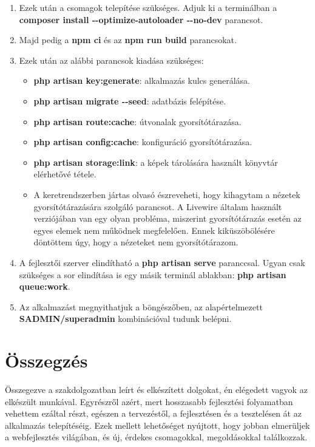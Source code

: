 \documentclass[
]{thesis-ekf}
\theoremstyle{definition}
\theoremstyle{remark}
\begin{document}
\begin{enumerate}
	\item Ezek után a csomagok telepítése szükséges. Adjuk ki a terminálban a \textbf{composer install -\/-optimize-autoloader -\/-no-dev} parancsot.
	\item Majd pedig a \textbf{npm ci} és az \textbf{npm run build} parancsokat.
	\item Ezek után az alábbi parancsok kiadása szükséges:
	\begin{itemize}
		\item \textbf{php artisan key:generate}: alkalmazás kulcs generálása.
		\item \textbf{php artisan migrate -\/-seed}: adatbázis felépítése.
		\item \textbf{php artisan route:cache}: útvonalak gyorsítótárazása.
		\item \textbf{php artisan config:cache}: konfiguráció gyorsítótárazása.
		\item \textbf{php artisan storage:link}: a képek tárolására használt könyvtár elérhetővé tétele.
		\item A keretrendszerben jártas olvasó észreveheti, hogy kihagytam a nézetek gyorsítótárazására szolgáló parancsot. A Livewire általam használt verziójában van egy olyan probléma, miszerint gyorsítótárazás esetén az egyes elemek nem működnek megfelelően. Ennek kiküszöbölésére döntöttem úgy, hogy a nézeteket nem gyorsítótárazom.
	\end{itemize}
	\item A fejlesztői szerver elindítható a \textbf{php artisan serve} paranccsal. Ugyan csak szükséges a sor elindítása is egy másik terminál ablakban: \textbf{php artisan queue:work}.
	\item Az alkalmazást megnyithatjuk a böngészőben, az alapértelmezett \textbf{SADMIN/superadmin} kombinációval tudunk belépni.
\end{enumerate}

\chapter*{Összegzés}

Összegezve a szakdolgozatban leírt és elkészített dolgokat, én elégedett vagyok az elkészült munkával. Egyrészről azért, mert hosszasabb fejlesztési folyamatban vehettem ezáltal részt, egészen a tervezéstől, a fejlesztésen és a tesztelésen át az alkalmazás telepítéséig. Ezek mellett lehetőséget nyújtott, hogy jobban elmerüljek a webfejlesztés világában, és új, érdekes csomagokkal, megoldásokkal találkozzak.
\end{document}
